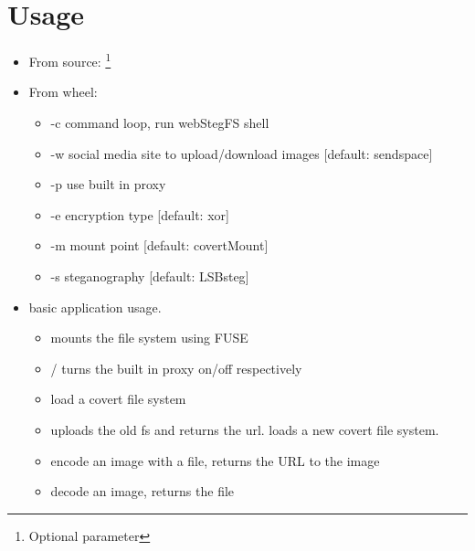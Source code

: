 \documentclass[letterpaper,12pt,openany,oneside]{sphinxmanual}
\begin{document}
\chapter{Usage}
\label{index:usage}\begin{itemize}
\item {} 
From source:  \footnote[1]{
Optional parameter
}

\item {} 
From wheel: 
\begin{itemize}
\item {} 
-c command loop, run webStegFS shell

\item {} 
-w social media site to upload/download images {[}default: sendspace{]}

\item {} 
-p use built in proxy

\item {} 
-e encryption type {[}default: xor{]}

\item {} 
-m mount point {[}default: covertMount{]}

\item {} 
-s steganography {[}default: LSBsteg{]}

\end{itemize}

\item {} 
 basic application usage.
\begin{itemize}
\item {} 
 mounts the file system using FUSE

\item {} 
 /  turns the built in proxy on/off respectively

\item {} 
 load a covert file system

\item {} 
 uploads the old fs and returns the url. loads a new covert file system.

\item {} 
 encode an image with a file, returns the URL to the image

\item {} 
 decode an image, returns the file


\end{itemize}
\end{itemize}
\end{document}
